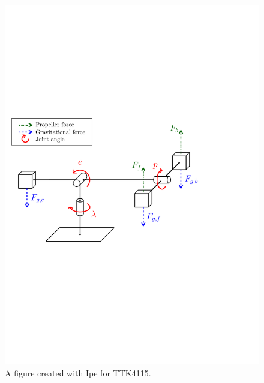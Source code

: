 \begin{figure}[tp]
	\centering
	\includegraphics[width=1.00\textwidth]{figures/template/forces.pdf}
	\caption{A figure created with Ipe for TTK4115.}
\label{fig:heli}
\end{figure}
